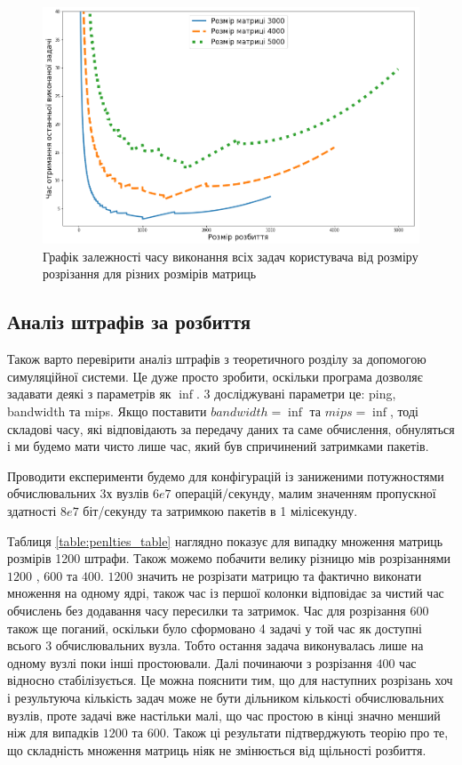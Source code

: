 \begin{figure}[H]
	\centering
	\includegraphics[width=\textwidth]{practice/img/one_user_different_N}
	\caption{Графік залежності часу виконання всіх задач користувача від розміру розрізання для різних розмірів матриць}
	\label{fig:one_diff_N}
\end{figure}

\subsection{Аналіз штрафів за розбиття}

Також варто перевірити аналіз штрафів з теоретичного розділу за допомогою симуляційної системи. Це дуже просто зробити, оскільки програма дозволяє задавати деякі з параметрів як $\inf$. 3 досліджувані параметри це: ping, bandwidth та mips. Якщо поставити $bandwidth=\inf$ та $mips=\inf$, тоді складові часу, які відповідають за передачу даних та саме обчислення, обнуляться і ми будемо мати чисто лише час, який був спричинений затримками пакетів.

Проводити експерименти будемо для конфігурацій із заниженими потужностями обчислювальних 3х вузлів $6e7$ операцій/секунду, малим значенням пропускної здатності $8e7$ біт/секунду та затримкою пакетів в 1 мілісекунду.

Таблиця \ref{table:penlties_table} наглядно показує для випадку множення матриць розмірів 1200 штрафи. Також можемо побачити велику різницю мів розрізаннями $1200$ , $600$ та $400$. $1200$ значить не розрізати матрицю та фактично виконати множення на одному ядрі, також час із першої колонки відповідає за чистий час обчислень без додавання часу пересилки та затримок. Час для розрізання $600$ також ще поганий, оскільки було сформовано 4 задачі у той час як доступні всього 3 обчислювальних вузла. Тобто остання задача виконувалась лише на одному вузлі поки інші простоювали. Далі починаючи з розрізання $400$ час відносно стабілізується. Це можна пояснити тим, що для наступних розрізань хоч і результуюча кількість задач може не бути дільником кількості обчислювальних вузлів, проте задачі вже настільки малі, що час простою в кінці значно менший ніж для випадків $1200$ та $600$. Також ці результати підтверджують теорію про те, що складність множення матриць ніяк не змінюється від щільності розбиття.

